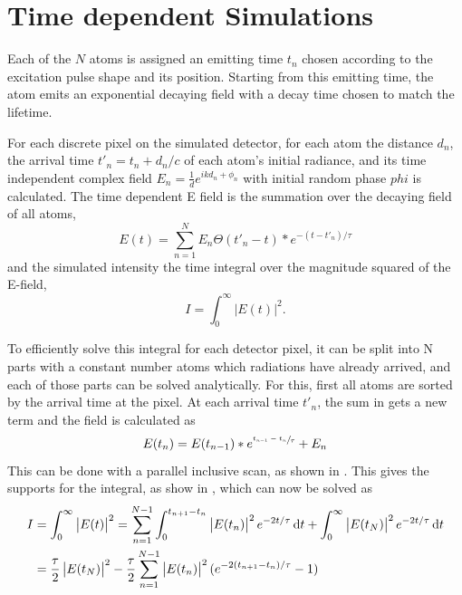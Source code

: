 \section{Time dependent Simulations}

Each of the $N$ atoms is assigned an emitting time $t_{n}$ chosen according to the excitation pulse shape and its position. Starting from this emitting time, the atom emits an exponential decaying field with a decay time chosen to match the lifetime. 



For each discrete pixel on the simulated detector, for each atom the distance $d_n$, the arrival time $t'_n=t_n+d_n/c$ of each atom's initial radiance, and its time independent complex field $E_n=\frac{1}{d} e^{ikd_n+\phi_n}$ with initial random phase $phi$ is calculated.
The time dependent E field is the summation over the decaying field of all atoms,
\begin{equation}
E(t)=\sum_{n=1}^N  E_n \Theta(t'_n  - t) * e^{-(t-t'_n )/\tau}
\label{eq:tdsum}
\end{equation}
and the simulated intensity the time integral over the magnitude squared of the E-field,
\begin{equation}
I=\int_0^\infty \left| E(t) \right|^2 .
\label{eq:tdint}
\end{equation}

To efficiently solve this integral for each detector pixel, it can be split into N parts with a constant number atoms which radiations have already arrived, and each of those parts can be solved analytically. For this, first all atoms are sorted by the arrival time at the pixel. At each arrival time $t'_n$, the sum in  gets a new term and the field is calculated as
\begin{equation}
E(t_n)=E(t_{n-1})*e^{\sfrac{t_{n-1}-t_n}{\tau}}+E_n
\end{equation}
 This can be done with a parallel inclusive scan, as shown in . This gives the supports for the integral, as show in , which can now be solved as
\begin{align}
	I&=\int_0^\infty \left| E(t) \right|^2 = \sum_{n=1}^{N-1} \int_0^{t_{n+1}-t_n} \left|E(t_n)\right|^2 e^{-2t/\tau} \dif t +\int_0^\infty \left| E(t_N)\right|^2 e^{-2t/\tau} \dif t \\
	 &=  \frac{\tau}{2}  \left|E(t_N)\right|^2 -  \frac{\tau}{2}\sum_{n=1}^{N-1} \left|E(t_n)\right|^2 (e^{-2 (t_{n+1}-t_n)/\tau} -1 ) 
\end{align}

